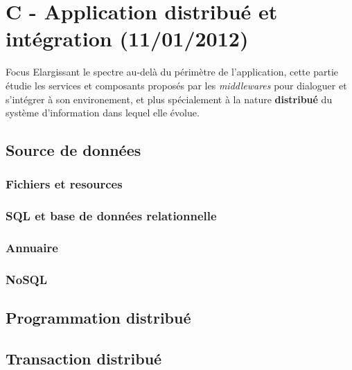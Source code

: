 \section{C - Application distribué et intégration (11/01/2012)}
\begin{frame}
  \begin{block}{Focus}
    Elargissant le spectre au-delà du périmètre de l'application,
    cette partie étudie les services et composants proposés par les
    \textit{middlewares} pour dialoguer et s'intégrer à son environement, et
    plus spécialement à la nature \textbf{distribué} du système d'information
    dans lequel elle évolue.
  \end{block}
\end{frame}
\subsection{Source de données}

\subsubsection{Fichiers et resources}
\subsubsection{SQL et base de données relationnelle}
\subsubsection{Annuaire}
\subsubsection{NoSQL}
\subsection{Programmation distribué}
\subsection{Transaction distribué}
